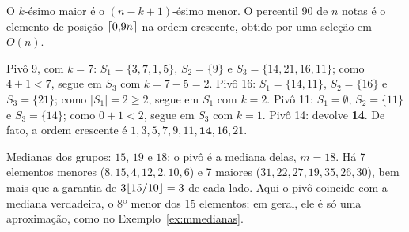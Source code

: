  O $k$-ésimo maior é o $(n-k+1)$-ésimo menor. O percentil 90 de $n$ notas é o elemento de posição $\lceil0{,}9n\rceil$ na ordem crescente, obtido por uma seleção em $O(n)$.

 Pivô 9, com $k=7$: $S_1=\{3,7,1,5\}$, $S_2=\{9\}$ e $S_3=\{14,21,16,11\}$; como $4+1<7$, segue em $S_3$ com $k=7-5=2$. Pivô 16: $S_1=\{14,11\}$, $S_2=\{16\}$ e $S_3=\{21\}$; como $|S_1|=2\ge2$, segue em $S_1$ com $k=2$. Pivô 11: $S_1=\emptyset$, $S_2=\{11\}$ e $S_3=\{14\}$; como $0+1<2$, segue em $S_3$ com $k=1$. Pivô 14: devolve \textbf{14}. De fato, a ordem crescente é $1,3,5,7,9,11,\mathbf{14},16,21$.

 Medianas dos grupos: $15$, $19$ e $18$; o pivô é a mediana delas, $m=18$. Há 7 elementos menores ($8,15,4,12,2,10,6$) e 7 maiores ($31,22,27,19,35,26,30$), bem mais que a garantia de $3\lfloor15/10\rfloor=3$ de cada lado. Aqui o pivô coincide com a mediana verdadeira, o 8º menor dos 15 elementos; em geral, ele é só uma aproximação, como no Exemplo~\ref{ex:mmedianas}.
